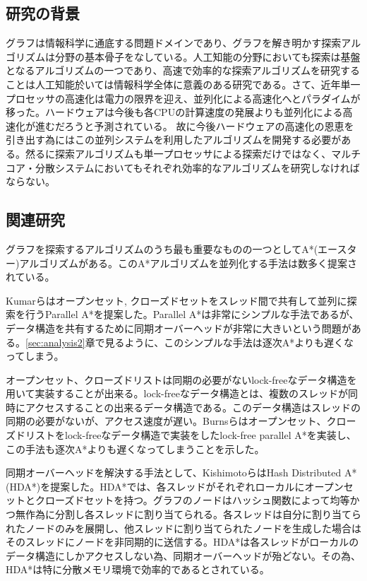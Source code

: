 \documentclass[uplatex]{jsarticle}
\begin{document}
\subsection{研究の背景}
グラフは情報科学に通底する問題ドメインであり、グラフを解き明かす探索アルゴリズムは分野の基本骨子をなしている。人工知能の分野においても探索は基盤となるアルゴリズムの一つであり、高速で効率的な探索アルゴリズムを研究することは人工知能於いては情報科学全体に意義のある研究である。さて、近年単一プロセッサの高速化は電力の限界を迎え、並列化による高速化へとパラダイムが移った。ハードウェアは今後も各CPUの計算速度の発展よりも並列化による高速化が進むだろうと予測されている。
故に今後ハードウェアの高速化の恩恵を引き出す為にはこの並列システムを利用したアルゴリズムを開発する必要がある。然るに探索アルゴリズムも単一プロセッサによる探索だけではなく、マルチコア・分散システムにおいてもそれぞれ効率的なアルゴリズムを研究しなければならない。


\subsection{関連研究}

グラフを探索するアルゴリズムのうち最も重要なものの一つとしてA*(エースター)アルゴリズムがある\cite{Hart1968}。このA*アルゴリズムを並列化する手法は数多く提案されている。


Kumarらはオープンセット, クローズドセットをスレッド間で共有して並列に探索を行うParallel A*を提案した。Parallel A*は非常にシンプルな手法であるが、データ構造を共有するために同期オーバーヘッドが非常に大きいという問題がある。\ref{sec:analysis2}章で見るように、このシンプルな手法は逐次A*よりも遅くなってしまう。

オープンセット、クローズドリストは同期の必要がないlock-freeなデータ構造を用いて実装することが出来る。lock-freeなデータ構造とは、複数のスレッドが同時にアクセスすることの出来るデータ構造である。このデータ構造はスレッドの同期の必要がないが、アクセス速度が遅い。Burnsらはオープンセット、クローズドリストをlock-freeなデータ構造で実装をしたlock-free parallel A*を実装し、この手法も逐次A*よりも遅くなってしまうことを示した。

同期オーバーヘッドを解決する手法として、KishimotoらはHash Distributed A* (HDA*)を提案した\cite{Kishimoto2013}。HDA*では、各スレッドがそれぞれローカルにオープンセットとクローズドセットを持つ。グラフのノードはハッシュ関数によって均等かつ無作為に分割し各スレッドに割り当てられる。各スレッドは自分に割り当てられたノードのみを展開し、他スレッドに割り当てられたノードを生成した場合はそのスレッドにノードを非同期的に送信する。HDA*は各スレッドがローカルのデータ構造にしかアクセスしない為、同期オーバーヘッドが殆どない。その為、HDA*は特に分散メモリ環境で効率的であるとされている。
\end{document}
